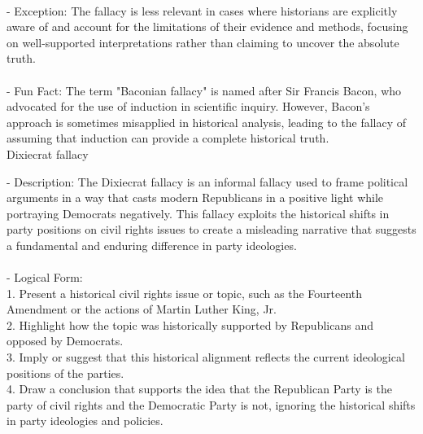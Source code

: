 \documentclass[a4paper,12pt,single,pdftex]{scrbook}
\begin{document}
    
      
    \\

    
      - Exception: The fallacy is less relevant in cases where historians are explicitly aware of and account for the limitations of their evidence and methods, focusing on well-supported interpretations rather than claiming to uncover the absolute truth.
    \\

    
      
    \\

    
      - Fun Fact: The term "Baconian fallacy" is named after Sir Francis Bacon, who advocated for the use of induction in scientific inquiry. However, Bacon's approach is sometimes misapplied in historical analysis, leading to the fallacy of assuming that induction can provide a complete historical truth.
    \\

  

Dixiecrat fallacy
    
      - Description: The Dixiecrat fallacy is an informal fallacy used to frame political arguments in a way that casts modern Republicans in a positive light while portraying Democrats negatively. This fallacy exploits the historical shifts in party positions on civil rights issues to create a misleading narrative that suggests a fundamental and enduring difference in party ideologies.
    \\

    
      
    \\

    
      - Logical Form:
    \\

    
        1. Present a historical civil rights issue or topic, such as the Fourteenth Amendment or the actions of Martin Luther King, Jr.
    \\

    
        2. Highlight how the topic was historically supported by Republicans and opposed by Democrats.
    \\

    
        3. Imply or suggest that this historical alignment reflects the current ideological positions of the parties.
    \\

    
        4. Draw a conclusion that supports the idea that the Republican Party is the party of civil rights and the Democratic Party is not, ignoring the historical shifts in party ideologies and policies.
    \\
\end{document}
